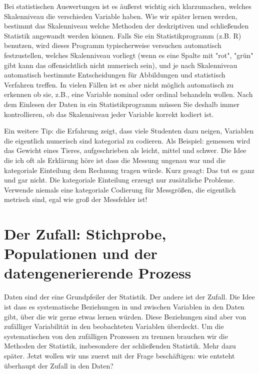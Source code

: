 \documentclass[a4paper,twoside]{tufte-book}\usepackage[]{graphicx}\usepackage[]{color}
\begin{document}
	Bei statistischen Auswertungen ist es äußerst wichtig sich klarzumachen, welches Skalenniveau die verschieden Variable haben. Wie wir später lernen werden, bestimmt das Skalenniveau welche Methoden der deskriptiven und schließenden Statistik angewandt werden können. Falls Sie ein Statistikprogramm (z.B. R) benutzen, wird dieses Programm typischerweise versuchen automatisch festzustellen, welches Skalenniveau vorliegt (wenn es eine Spalte mit "rot", "grün" gibt kann das offensichtlich nicht numerisch sein), und je nach Skalenniveau automatisch bestimmte Entscheidungen für Abbildungen und statistisch Verfahren treffen. In vielen Fällen ist es aber nicht möglich automatisch zu erkennen ob sie, z.B., eine Variable nominal oder ordinal behandeln wollen. Nach dem Einlesen der Daten in ein Statistikprogramm müssen Sie deshalb immer kontrollieren, ob das Skalenniveau jeder Variable korrekt kodiert ist. 
	
	Ein weitere Tip: die Erfahrung zeigt, dass viele Studenten dazu neigen, Variablen die eigentlich numerisch sind kategorial zu codieren. Als Beispiel: gemessen wird das Gewicht eines Tieres, aufgeschrieben als leicht, mittel und schwer. Die Idee die ich oft als Erklärung höre ist dass die Messung ungenau war und die kategoriale Einteilung dem Rechnung tragen würde. Kurz gesagt: Das tut es ganz und gar nicht. Die kategoriale Einteilung erzeugt nur zusätzliche Probleme. Verwende niemals eine kategoriale Codierung für Messgrößen, die eigentlich metrisch sind, egal wie groß der Messfehler ist!

	\section{Der Zufall: Stichprobe, Populationen und der datengenerierende Prozess}
	
	Daten sind der eine Grundpfeiler der Statistik. Der andere ist der Zufall. Die Idee ist dass es systematische Beziehungen in und zwischen Variablen in den Daten gibt, über die wir gerne etwas lernen würden. Diese Beziehungen sind aber von zufälliger Variabilität in den beobachteten Variablen überdeckt. Um die systematischen von den zufälligen Prozessen zu trennen brauchen wir die Methoden der Statistik, insbesondere der schließenden Statistik. Mehr dazu später. Jetzt wollen wir uns zuerst mit der Frage beschäftigen: wie entsteht überhaupt der Zufall in den Daten?
	
\end{document}
